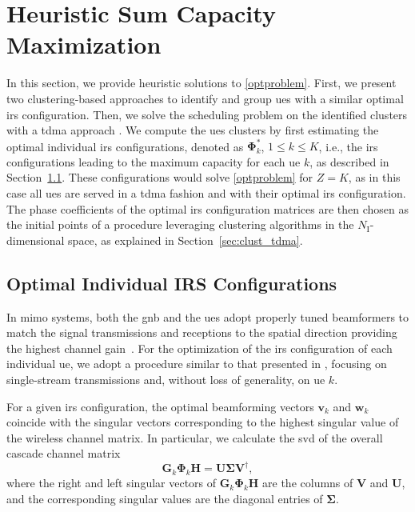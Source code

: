 \section{Heuristic Sum Capacity Maximization}
\label{sec:optimization}
In this section, we provide heuristic solutions to \eqref{optproblem}. First, we present two clustering-based approaches to identify and group \glspl{ue} with a similar optimal \gls{irs} configuration. Then, we solve the scheduling problem on the identified clusters with a \gls{tdma} approach \cite{anchora2012capacity}.
 We compute the \glspl{ue} clusters by first estimating the optimal {individual \gls{irs} configurations}, denoted as $\bm{\Phi}^*_k$, $1\leq k \leq K$, i.e., the \gls{irs} configurations leading to the maximum capacity for each \gls{ue} $k$, as described in Section~\ref{sec:ind_opt}.
 These configurations would solve \eqref{optproblem} for
$Z = K$, as in this case all \glspl{ue} are served in a \gls{tdma} fashion and with their optimal \gls{irs} configuration.
The phase coefficients of the optimal \gls{irs} configuration matrices are then chosen as the initial points of a procedure leveraging clustering algorithms in the $N_{\mathrm I}$-dimensional space, as explained in Section~\ref{sec:clust_tdma}.

\subsection{Optimal Individual IRS Configurations  }
\label{sec:ind_opt}
In \gls{mimo} systems, both the \gls{gnb} and the \glspl{ue} adopt properly tuned beamformers to match the signal transmissions and receptions to the spatial direction providing the highest channel gain~\cite{flamini2022towards}. For the optimization of the \gls{irs} configuration of each individual \gls{ue}, we adopt a procedure similar to that presented in \cite{Qian22joint}, focusing on single-stream transmissions and, without loss of generality, on \gls{ue} $k$.


For a given \gls{irs} configuration, the optimal beamforming vectors  $\bm{v}_k$ and $\bm{w}_k$ coincide with the singular vectors corresponding to the highest singular value of the wireless channel matrix. In particular, we calculate the \gls{svd} of the overall cascade channel matrix
\begin{equation}\label{eq:svd}
    \bm{G}_k \bm{\Phi}_k \bm{H} = \bm{U}\bm{\Sigma}\bm{V}^\dagger,
\end{equation}
where the right and left singular vectors of $\bm{G}_k \bm{\Phi}_k \bm{H}$ are the columns of $\bm{V}$ and $\bm{U}$, and the corresponding singular values are the diagonal entries of $\bm{\Sigma}$.

